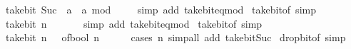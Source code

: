\begin{isabellebody}
\ \ {\isacartoucheopen}take{\isacharunderscore}{\kern0pt}bit\ {\isacharparenleft}{\kern0pt}Suc\ {}{\isacharparenright}{\kern0pt}\ a\ {\isacharequal}{\kern0pt}\ a\ mod\ {}{\isacartoucheclose}\isanewline
%
\isadelimproof
\ \ %
\endisadelimproof
%
\isatagproof
{}\isamarkupfalse%
\ {\isacharparenleft}{\kern0pt}simp\ add{\isacharcolon}{\kern0pt}\ take{\isacharunderscore}{\kern0pt}bit{\isacharunderscore}{\kern0pt}eq{\isacharunderscore}{\kern0pt}mod{\isacharparenright}{\kern0pt}%
\endisatagproof
{\isafoldproof}%
%
\isadelimproof
\isanewline
%
\endisadelimproof
\isanewline
{}\isamarkupfalse%
\ take{\isacharunderscore}{\kern0pt}bit{\isacharunderscore}{\kern0pt}of{\isacharunderscore}{\kern0pt}{}\ {\isacharbrackleft}{\kern0pt}simp{\isacharbrackright}{\kern0pt}{\isacharcolon}{\kern0pt}\isanewline
\ \ {\isachardoublequoteopen}take{\isacharunderscore}{\kern0pt}bit\ n\ {}\ {\isacharequal}{\kern0pt}\ {}{\isachardoublequoteclose}\isanewline
%
\isadelimproof
\ \ %
\endisadelimproof
%
\isatagproof
{}\isamarkupfalse%
\ {\isacharparenleft}{\kern0pt}simp\ add{\isacharcolon}{\kern0pt}\ take{\isacharunderscore}{\kern0pt}bit{\isacharunderscore}{\kern0pt}eq{\isacharunderscore}{\kern0pt}mod{\isacharparenright}{\kern0pt}%
\endisatagproof
{\isafoldproof}%
%
\isadelimproof
\isanewline
%
\endisadelimproof
\isanewline
{}\isamarkupfalse%
\ take{\isacharunderscore}{\kern0pt}bit{\isacharunderscore}{\kern0pt}of{\isacharunderscore}{\kern0pt}{}\ {\isacharbrackleft}{\kern0pt}simp{\isacharbrackright}{\kern0pt}{\isacharcolon}{\kern0pt}\isanewline
\ \ {\isachardoublequoteopen}take{\isacharunderscore}{\kern0pt}bit\ n\ {}\ {\isacharequal}{\kern0pt}\ of{\isacharunderscore}{\kern0pt}bool\ {\isacharparenleft}{\kern0pt}n\ {\isachargreater}{\kern0pt}\ {}{\isacharparenright}{\kern0pt}{\isachardoublequoteclose}\isanewline
%
\isadelimproof
\ \ %
\endisadelimproof
%
\isatagproof
{}\isamarkupfalse%
\ {\isacharparenleft}{\kern0pt}cases\ n{\isacharparenright}{\kern0pt}\ {\isacharparenleft}{\kern0pt}simp{\isacharunderscore}{\kern0pt}all\ add{\isacharcolon}{\kern0pt}\ take{\isacharunderscore}{\kern0pt}bit{\isacharunderscore}{\kern0pt}Suc{\isacharparenright}{\kern0pt}%
\endisatagproof
{\isafoldproof}%
%
\isadelimproof
\isanewline
%
\endisadelimproof
\isanewline
{}\isamarkupfalse%
\ drop{\isacharunderscore}{\kern0pt}bit{\isacharunderscore}{\kern0pt}of{\isacharunderscore}{\kern0pt}{}\ {\isacharbrackleft}{\kern0pt}simp{\isacharbrackright}{\kern0pt}{\isacharcolon}{\kern0pt}\isanewline

\end{isabellebody}
